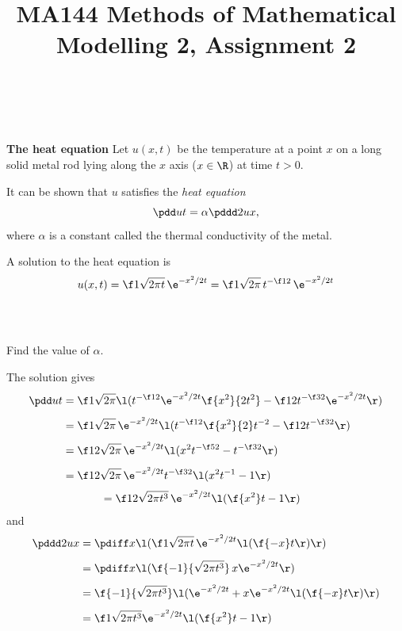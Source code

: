 \documentclass[a4paper]{article}
\title{MA144 Methods of Mathematical Modelling 2, Assignment 2}
\begin{document}
\maketitle

\setlength{\parindent}{0em}
\setlength{\parskip}{1em}


\subsection{~} %

\begin{questionbody}
\textbf{The heat equation} \quad
Let $u(x, t)$ be the temperature at a point $x$ on a long solid metal rod lying along the $x$ axis ($x \in \R$) at time $t > 0$.

It can be shown that $u$ satisfies the \textit{heat equation} \[
\pdd ut = \alpha \pddd 2ux,
\] where $\alpha$ is a constant called the thermal conductivity of the metal.

A solution to the heat equation is \[
u(x, t) = \f1{\sqrt{2 \pi t}}\, \e^{- x^2 / 2t} = \f1{\sqrt{2\pi}}\, t^{-\f12}\, \e^{- x^2 / 2t}
\]
\end{questionbody}

\subsubsection{~} %

\begin{questionbody}
Find the value of $\alpha$.
\end{questionbody}

The solution gives \begin{align*}
\pdd ut &= \f1{\sqrt{2\pi}} \l( t^{-\f12} \e^{-x^2 / 2t} \f{x^2}{2t^2} - \f12 t^{-\f32} \e^{-x^2 / 2t} \r) \\[1ex]
&= \f1{\sqrt{2\pi}}\, \e^{-x^2 / 2t} \l( t^{-\f12} \f{x^2}{2} t^{-2} - \f12 t^{-\f32} \r) \\[1ex]
&= \f1{2\sqrt{2\pi}}\, \e^{-x^2 / 2t} \l( x^2 t^{-\f52} - t^{-\f32} \r) \\[1ex]
&= \f1{2\sqrt{2\pi}}\, \e^{-x^2 / 2t} t^{-\f32} \l( x^2 t^{-1} - 1 \r)
\end{align*}
\begin{align*}
&= \f1{2\sqrt{2\pi t^3}}\, \e^{-x^2 / 2t} \l( \f{x^2}t - 1 \r)
\end{align*}
and \begin{align*}
\pddd 2ux &= \pdiff x \l( \f1{\sqrt{2\pi t}}\, \e^{-x^2 / 2t} \l( \f{-x}t \r) \r) \\[1ex]
&= \pdiff x \l( \f{-1}{\sqrt{2\pi t^3}}\, x \e^{-x^2 / 2t} \r) \\[1ex]
&= \f{-1}{\sqrt{2\pi t^3}} \l( \e^{-x^2 / 2t} + x \e^{-x^2 / 2t} \l(\f{-x}t\r) \r) \\[1ex]
&= \f1{\sqrt{2\pi t^3}} \e^{-x^2 / 2t} \l( \f{x^2}t - 1 \r)
\end{align*}
\end{document}
